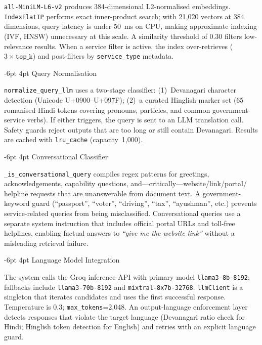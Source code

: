 \documentclass[10pt,twocolumn]{article}
\makeatletter
\renewcommand{\subsection}{\@startsection{subsection}{2}{\z@}%
  {-6pt \@plus -1pt \@minus -0.5pt}%
  {4pt \@plus 0.2pt}%
  {\normalfont\large\bfseries}}
\makeatother
\begin{document}
\texttt{all-MiniLM-L6-v2} produces 384-dimensional L2-normalised embeddings.
\texttt{IndexFlatIP} performs exact inner-product search; with 21,020 vectors at
384 dimensions, query latency is under 50~ms on CPU, making approximate indexing
(IVF, HNSW) unnecessary at this scale.  A similarity threshold of 0.30 filters
low-relevance results.  When a service filter is active, the index over-retrieves
($3\times\texttt{top\_k}$) and post-filters by \texttt{service\_type} metadata.

\subsection{Query Normalisation}

\texttt{normalize\_query\_llm} uses a two-stage classifier:
(1)~Devanagari character detection (Unicode U+0900--U+097F);
(2)~a curated Hinglish marker set (65 romanised Hindi tokens covering pronouns,
particles, and common government-service verbs).
If either triggers, the query is sent to an LLM translation call.
Safety guards reject outputs that are too long or still contain Devanagari.
Results are cached with \texttt{lru\_cache} (capacity~1,000).

\subsection{Conversational Classifier}

\texttt{\_is\_conversational\_query} compiles regex patterns for greetings,
acknowledgements, capability questions, and---critically---website/link/portal/
helpline requests that are unanswerable from document text.
A government-keyword guard (``passport'', ``voter'', ``driving'', ``tax'',
``ayushman'', etc.) prevents service-related queries from being misclassified.
Conversational queries use a separate system instruction that includes official
portal URLs and toll-free helplines, enabling factual answers to
\emph{``give me the website link''} without a misleading retrieval failure.

\subsection{Language Model Integration}

The system calls the Groq inference API with primary model
\texttt{llama3-8b-8192}; fallbacks include \texttt{llama3-70b-8192}
and \texttt{mixtral-8x7b-32768}.  \texttt{llmClient} is a singleton that iterates
candidates and uses the first successful response.  Temperature is 0.3;
\texttt{max\_tokens}=2,048.  An output-language enforcement layer detects responses
that violate the target language (Devanagari ratio check for Hindi;
Hinglish token detection for English) and retries with an explicit language guard.
\end{document}
